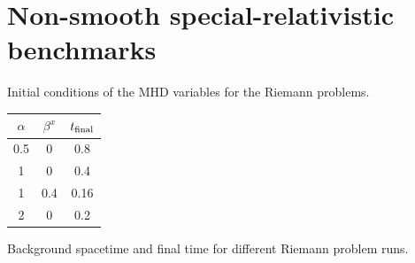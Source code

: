 \section{Non-smooth special-relativistic benchmarks}
\label{sec:discontinuous_sr}

\begin{margintable}
\begin{center} 
\caption[
  Initial condition parameters for the MHD Riemann problem
]{Initial conditions of the MHD variables for the Riemann 
problems.}\label{tab:RP1D}
\end{center}
\end{margintable}
\begin{margintable}
	\begin{center} 
			\begin{tabular}{ccc} %
				\toprule
				$\alpha$ & $\beta^x$ & $t_{\rm final}$ \\
				\midrule
                0.5 & 0   & 0.8 \\
                1 & 0 & 0.4 \\
                1 & 0.4 & 0.16 \\
                2 & 0 & 0.2 \\
				\hline
			\end{tabular} 
		\caption[
           Different Riemann problem curved background parameters
		]{Background spacetime and final time for different
		  Riemann problem runs.}\label{tab:RP1D-ADM}
	\end{center}
\end{margintable}

